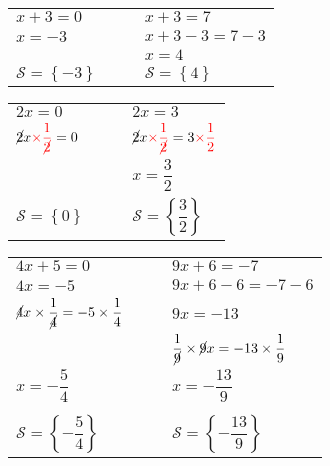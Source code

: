 \bigskip 

\begin{tabular}{lM{3cm}|M{1cm}l}

$x+3 = 0$ &   & & $x +3 = 7 $\\
$x=-3$   &  & & $x+3 -3 = 7 -3 $\\
  &  & & $x = 4 $\\
$\mathcal{S} =\left\lbrace -3 \right\rbrace$ &  & & $\mathcal{S} =\left\lbrace 4 \right\rbrace$ \\  
  
\end{tabular}
              
\bigskip                  
                 
                 
   \hspace*{2cm} 

\bigskip 

\begin{tabular}{lM{3.5cm}|M{1cm}l}

$2x = 0$ &   & & $2x = 3 $\\
$ \cancel{2}x \textcolor{red}{\times \dfrac{1}{\cancel{2}}}=0$   &  & & $ \cancel{2}x \textcolor{red}{\times \dfrac{1}{\cancel{2}}} = 3 \textcolor{red}{\times \dfrac{1}{2}} $\\
& & & $x = \dfrac{3}{2}$\\
$\mathcal{S} =\left\lbrace 0 \right\rbrace$ &  &  & $\mathcal{S} =\left\lbrace \dfrac{3}{2} \right\rbrace$ \\  
\end{tabular}

\bigskip                  
              
                 

\bigskip 

\begin{tabular}{lM{4cm}|M{1cm}l}

$4x + 5 = 0$ & 
     & & $9x + 6 = - 7 $\\
$4x= -5 $   &  & &$9x + 6 -6   = - 7 -6 $\\
$\cancel{4}x \times \dfrac{1}{\cancel{4}} = - 5 \times \dfrac{1}{4} $  & 
     & & $9x = -13  $\\
 &  & & $ \dfrac{1}{\cancel{9}} \times \cancel{9}x = -13 \times \dfrac{1}{9} $\\   
$x = -\dfrac{5}{4} $   &  & & $x = - \dfrac{13}{9} $\\
 &  & & \\  
$\mathcal{S} =\left\lbrace -\dfrac{5}{4} \right\rbrace$ &  & &  $\mathcal{S} =\left\lbrace  -\dfrac{13}{9} \right\rbrace$ \\    
\end{tabular}          
  

